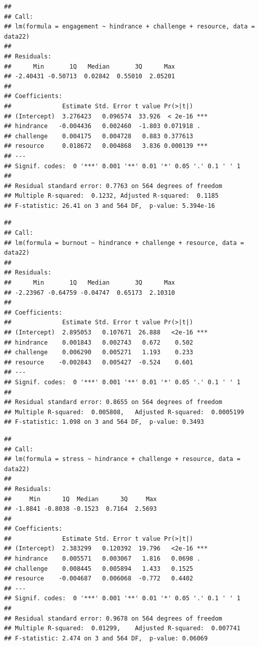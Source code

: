 \documentclass[
  man]{apa6}
\begin{document}
\begin{verbatim}
## 
## Call:
## lm(formula = engagement ~ hindrance + challenge + resource, data = data22)
## 
## Residuals:
##      Min       1Q   Median       3Q      Max 
## -2.40431 -0.50713  0.02842  0.55010  2.05201 
## 
## Coefficients:
##              Estimate Std. Error t value Pr(>|t|)    
## (Intercept)  3.276423   0.096574  33.926  < 2e-16 ***
## hindrance   -0.004436   0.002460  -1.803 0.071918 .  
## challenge    0.004175   0.004728   0.883 0.377613    
## resource     0.018672   0.004868   3.836 0.000139 ***
## ---
## Signif. codes:  0 '***' 0.001 '**' 0.01 '*' 0.05 '.' 0.1 ' ' 1
## 
## Residual standard error: 0.7763 on 564 degrees of freedom
## Multiple R-squared:  0.1232, Adjusted R-squared:  0.1185 
## F-statistic: 26.41 on 3 and 564 DF,  p-value: 5.394e-16
\end{verbatim}

\begin{verbatim}
## 
## Call:
## lm(formula = burnout ~ hindrance + challenge + resource, data = data22)
## 
## Residuals:
##      Min       1Q   Median       3Q      Max 
## -2.23967 -0.64759 -0.04747  0.65173  2.10310 
## 
## Coefficients:
##              Estimate Std. Error t value Pr(>|t|)    
## (Intercept)  2.895053   0.107671  26.888   <2e-16 ***
## hindrance    0.001843   0.002743   0.672    0.502    
## challenge    0.006290   0.005271   1.193    0.233    
## resource    -0.002843   0.005427  -0.524    0.601    
## ---
## Signif. codes:  0 '***' 0.001 '**' 0.01 '*' 0.05 '.' 0.1 ' ' 1
## 
## Residual standard error: 0.8655 on 564 degrees of freedom
## Multiple R-squared:  0.005808,   Adjusted R-squared:  0.0005199 
## F-statistic: 1.098 on 3 and 564 DF,  p-value: 0.3493
\end{verbatim}

\begin{verbatim}
## 
## Call:
## lm(formula = stress ~ hindrance + challenge + resource, data = data22)
## 
## Residuals:
##     Min      1Q  Median      3Q     Max 
## -1.8841 -0.8038 -0.1523  0.7164  2.5693 
## 
## Coefficients:
##              Estimate Std. Error t value Pr(>|t|)    
## (Intercept)  2.383299   0.120392  19.796   <2e-16 ***
## hindrance    0.005571   0.003067   1.816   0.0698 .  
## challenge    0.008445   0.005894   1.433   0.1525    
## resource    -0.004687   0.006068  -0.772   0.4402    
## ---
## Signif. codes:  0 '***' 0.001 '**' 0.01 '*' 0.05 '.' 0.1 ' ' 1
## 
## Residual standard error: 0.9678 on 564 degrees of freedom
## Multiple R-squared:  0.01299,    Adjusted R-squared:  0.007741 
## F-statistic: 2.474 on 3 and 564 DF,  p-value: 0.06069
\end{verbatim}
\end{document}

